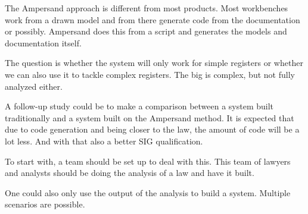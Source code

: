 The Ampersand approach is different from most products. 
Most workbenches work from a drawn model and from there generate code from the documentation or possibly. 
Ampersand does this from a script and generates the models and documentation itself.

The question is whether the system will only work for simple registers or whether we can also use it to tackle complex registers.
The \acrshort{big} is complex, but not fully analyzed either.

A follow-up study could be to make a comparison between a system built traditionally and a system built on the Ampersand method. 
It is expected that due to code generation and being closer to the law, the amount of code will be a lot less. 
And with that also a better SIG qualification.

To start with, a team should be set up to deal with this. 
This team of lawyers and analysts should be doing the analysis of a law and have it built.

One could also only use the output of the analysis to build a system. 
Multiple scenarios are possible.